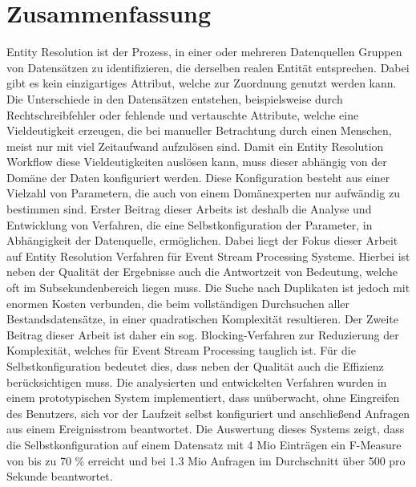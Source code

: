 %
\chapter*{Zusammenfassung}
\label{sec:abstract}
\vspace*{-10mm}

Entity Resolution ist der Prozess, in einer oder mehreren Datenquellen
Gruppen von Datensätzen zu identifizieren, die derselben realen Entität
entsprechen. Dabei gibt es kein einzigartiges Attribut, welche zur
Zuordnung genutzt werden kann. Die Unterschiede in den Datensätzen
entstehen, beispielsweise durch Rechtschreibfehler oder fehlende und
vertauschte Attribute, welche eine Vieldeutigkeit erzeugen, die bei
manueller Betrachtung durch einen Menschen, meist nur mit viel Zeitaufwand
aufzulösen sind. Damit ein Entity Resolution Workflow diese
Vieldeutigkeiten auslösen kann, muss dieser abhängig von der Domäne der
Daten konfiguriert werden. Diese Konfiguration besteht aus einer Vielzahl
von Parametern, die auch von einem Domänexperten nur aufwändig zu
bestimmen sind. Erster Beitrag dieser Arbeits ist deshalb die Analyse und
Entwicklung von Verfahren, die eine Selbstkonfiguration der Parameter, in
Abhängigkeit der Datenquelle, ermöglichen. Dabei liegt der Fokus dieser
Arbeit auf Entity Resolution Verfahren für Event Stream Processing
Systeme. Hierbei ist neben der Qualität der Ergebnisse auch die
Antwortzeit von Bedeutung, welche oft im Subsekundenbereich liegen muss.
Die Suche nach Duplikaten ist jedoch mit enormen Kosten verbunden, die
beim vollständigen Durchsuchen aller Bestandsdatensätze, in einer
quadratischen Komplexität resultieren. Der Zweite Beitrag dieser Arbeit
ist daher ein sog. Blocking-Verfahren zur Reduzierung der Komplexität,
welches für Event Stream Processing tauglich ist. Für die
Selbstkonfiguration bedeutet dies, dass neben der Qualität auch die
Effizienz berücksichtigen muss. Die analysierten und entwickelten
Verfahren wurden in einem prototypischen System implementiert, dass
unüberwacht, ohne Eingreifen des Benutzers, sich vor der Laufzeit selbst
konfiguriert und anschließend Anfragen aus einem Ereignisstrom
beantwortet. Die Auswertung dieses Systems zeigt, dass die
Selbstkonfiguration auf einem Datensatz mit 4 Mio Einträgen ein F-Measure
von bis zu 70 \% erreicht und bei 1.3 Mio Anfragen im Durchschnitt über
500 pro Sekunde beantwortet.
